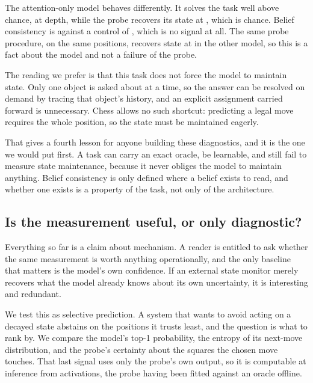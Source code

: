 The attention-only model behaves differently. It solves the task well above
chance,  at depth, while the probe recovers its state at
, which is chance. Belief consistency is
 against a control of , which is
no signal at all. The same probe procedure, on the same positions, recovers state
at  in the other model, so this is a fact about the
model and not a failure of the probe.

The reading we prefer is that this task does not force the model to maintain
state. Only one object is asked about at a time, so the answer can be resolved on
demand by tracing that object's history, and an explicit assignment carried
forward is unnecessary. Chess allows no such shortcut: predicting a legal move
requires the whole position, so the state must be maintained eagerly.

That gives a fourth lesson for anyone building these diagnostics, and it is the
one we would put first. A task can carry an exact oracle, be learnable, and still
fail to measure state maintenance, because it never obliges the model to
maintain anything. Belief consistency is only defined where a belief exists to
read, and whether one exists is a property of the task, not only of the
architecture.



\subsection{Is the measurement useful, or only diagnostic?}
\label{sec:abstain}

Everything so far is a claim about mechanism. A reader is entitled to ask whether
the same measurement is worth anything operationally, and the only baseline that
matters is the model's own confidence. If an external state monitor merely
recovers what the model already knows about its own uncertainty, it is
interesting and redundant.

We test this as selective prediction. A system that wants to avoid acting on a
decayed state abstains on the positions it trusts least, and the question is what
to rank by. We compare the model's top-1 probability, the entropy of its
next-move distribution, and the probe's certainty about the squares the chosen
move touches. That last signal uses only the probe's own output, so it is
computable at inference from activations, the probe having been fitted against an
oracle offline.

